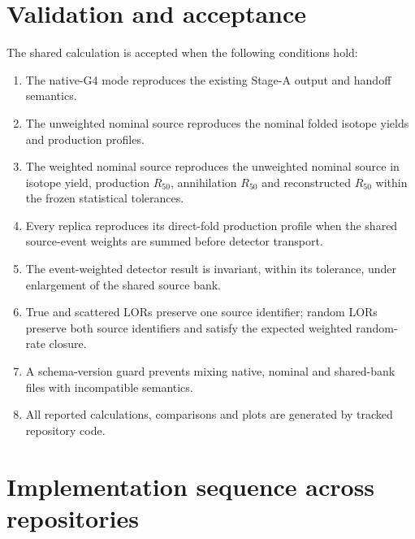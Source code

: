 \documentclass[11pt]{article}
\begin{document}
\section{Validation and acceptance}

The shared calculation is accepted when the following conditions hold:

\begin{enumerate}
  \item The native-G4 mode reproduces the existing Stage-A output and handoff
        semantics.

  \item The unweighted nominal source reproduces the nominal folded isotope
        yields and production profiles.

  \item The weighted nominal source reproduces the unweighted nominal source
        in isotope yield, production $R_{50}$, annihilation $R_{50}$ and
        reconstructed $R_{50}$ within the frozen statistical tolerances.

  \item Every replica reproduces its direct-fold production profile when the
        shared source-event weights are summed before detector transport.

  \item The event-weighted detector result is invariant, within its tolerance,
        under enlargement of the shared source bank.

  \item True and scattered LORs preserve one source identifier; random LORs
        preserve both source identifiers and satisfy the expected weighted
        random-rate closure.

  \item A schema-version guard prevents mixing native, nominal and shared-bank
        files with incompatible semantics.

  \item All reported calculations, comparisons and plots are generated by
        tracked repository code.
\end{enumerate}

\section{Implementation sequence across repositories}
\end{document}
